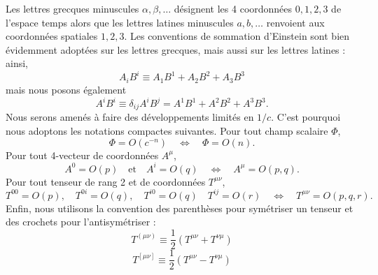 			Les lettres grecques minuscules $\alpha,\beta,\ldots$ désignent les 4 coordonnées $0,1,2,3$ de l'espace temps alors que les lettres latines minuscules $a,b,\ldots$ renvoient aux coordonnées spatiales $1,2,3$. Les conventions de sommation d'Einstein sont bien évidemment adoptées sur les lettres grecques, mais aussi sur les lettres latines : ainsi,
			\begin{equation}
				A_iB^i \equiv A_1B^1 + A_2B^2+A_3B^3
			\end{equation}
			mais nous posons également
			\begin{equation}
				A^iB^i \equiv \delta_{ij}A^iB^j=A^1B^1+A^2B^2+A^3B^3.
			\end{equation}
			Nous serons amenés à faire des développements limités en $1/c$. C'est pourquoi nous adoptons les notations compactes suivantes. Pour tout champ scalaire $\Phi$,
			\begin{equation}
				\Phi = O(c^{-n}) \quad \Leftrightarrow \quad \Phi=O(n).
			\end{equation}
			Pour tout 4-vecteur de coordonnées $A^\mu$,
			\begin{equation}
				A^0=O(p)\quad\text{et}\quad A^i=O(q) \quad \Leftrightarrow \quad A^\mu=O(p,q). 
			\end{equation}
			Pour tout tenseur de rang 2 et de coordonnées $T^{\mu\nu}$,
			\begin{equation}
				T^{00}=O(p), \quad T^{0i}=O(q), \quad T^{i0}=O(q)\quad T^{ij}=O(r) \quad \Leftrightarrow \quad T^{\mu\nu}=O(p,q,r).
			\end{equation}
			Enfin, nous utilisons la convention des parenthèses pour symétriser un tenseur et des crochets pour l'antisymétriser :
			\begin{equation}\label{parent_sym}
				T^{(\mu\nu)}\equiv\frac{1}{2}(T^{\mu\nu}+T^{\nu\mu})
			\end{equation}
			\begin{equation}
				T^{[\mu\nu]}\equiv\frac{1}{2}(T^{\mu\nu}-T^{\nu\mu})
			\end{equation}

